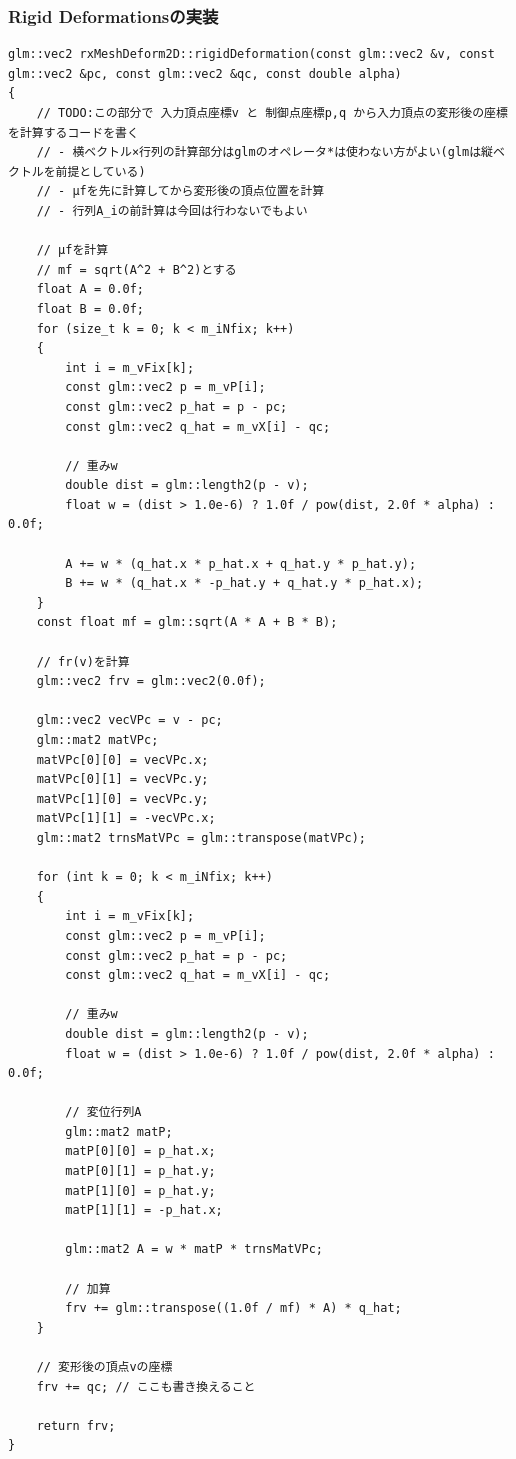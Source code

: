 \documentclass[a4paper,10pt,uplatex,dvipdfmx]{jsarticle}
\begin{document}
\subsubsection{Rigid Deformationsの実装}
\begin{lstlisting}[caption=rigidDeformation]
glm::vec2 rxMeshDeform2D::rigidDeformation(const glm::vec2 &v, const glm::vec2 &pc, const glm::vec2 &qc, const double alpha)
{
	// TODO:この部分で 入力頂点座標v と 制御点座標p,q から入力頂点の変形後の座標を計算するコードを書く
	// - 横ベクトル×行列の計算部分はglmのオペレータ*は使わない方がよい(glmは縦ベクトルを前提としている)
	// - μfを先に計算してから変形後の頂点位置を計算
	// - 行列A_iの前計算は今回は行わないでもよい

	// μfを計算
	// mf = sqrt(A^2 + B^2)とする
	float A = 0.0f;
	float B = 0.0f;
	for (size_t k = 0; k < m_iNfix; k++)
	{
		int i = m_vFix[k];
		const glm::vec2 p = m_vP[i];
		const glm::vec2 p_hat = p - pc;
		const glm::vec2 q_hat = m_vX[i] - qc;

		// 重みw
		double dist = glm::length2(p - v);
		float w = (dist > 1.0e-6) ? 1.0f / pow(dist, 2.0f * alpha) : 0.0f;

		A += w * (q_hat.x * p_hat.x + q_hat.y * p_hat.y);
		B += w * (q_hat.x * -p_hat.y + q_hat.y * p_hat.x);
	}
	const float mf = glm::sqrt(A * A + B * B);

	// fr(v)を計算
	glm::vec2 frv = glm::vec2(0.0f);

	glm::vec2 vecVPc = v - pc;
	glm::mat2 matVPc;
	matVPc[0][0] = vecVPc.x;
	matVPc[0][1] = vecVPc.y;
	matVPc[1][0] = vecVPc.y;
	matVPc[1][1] = -vecVPc.x;
	glm::mat2 trnsMatVPc = glm::transpose(matVPc);

	for (int k = 0; k < m_iNfix; k++)
	{
		int i = m_vFix[k];
		const glm::vec2 p = m_vP[i];
		const glm::vec2 p_hat = p - pc;
		const glm::vec2 q_hat = m_vX[i] - qc;

		// 重みw
		double dist = glm::length2(p - v);
		float w = (dist > 1.0e-6) ? 1.0f / pow(dist, 2.0f * alpha) : 0.0f;

		// 変位行列A
		glm::mat2 matP;
		matP[0][0] = p_hat.x;
		matP[0][1] = p_hat.y;
		matP[1][0] = p_hat.y;
		matP[1][1] = -p_hat.x;

		glm::mat2 A = w * matP * trnsMatVPc;

		// 加算
		frv += glm::transpose((1.0f / mf) * A) * q_hat;
	}

	// 変形後の頂点vの座標
	frv += qc; // ここも書き換えること

	return frv;
}
\end{lstlisting}
\end{document}
